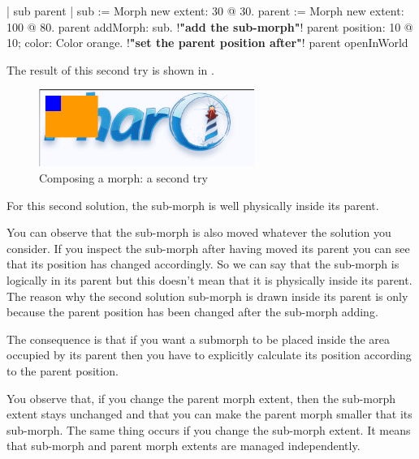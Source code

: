 \documentclass[a4paper,10pt,twoside]{book}
\begin{document}

\begin{code}
| sub parent |
sub := Morph new extent: 30 @ 30. 
parent := Morph new extent: 100 @ 80. 
parent addMorph: sub. !\textbf{"add the sub-morph"}!
parent position: 10 @ 10; color: Color orange. !\textbf{"set the parent position after"}!
parent openInWorld 
\end{code}
The result of this second try is shown in .
\begin{figure}[htbp]
\begin{center}
	\includegraphics[width=7cm]{composingMorph2}
	\caption{Composing a morph: a second try}
\end{center}
\end{figure}

For this second solution, the sub-morph is well physically inside its parent.


You can observe that the sub-morph is also moved whatever the solution you consider. If you inspect the sub-morph after having moved its parent you can see that its position has changed accordingly. So we can say that the sub-morph is logically in its parent but this doesn't mean that it is physically inside its parent. The reason why the second solution sub-morph is drawn inside its parent is only because the parent position has been changed after the sub-morph adding. 

The consequence is that if you want a submorph to be placed inside the area occupied by its parent then you have to explicitly calculate its position according to the parent position.


You observe that, if you change the parent morph extent, then the sub-morph extent stays unchanged and that you can make the parent morph smaller that its sub-morph. The same thing occurs if you change the sub-morph extent. It means that sub-morph and parent morph extents are managed independently.
\end{document}
